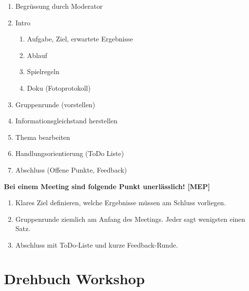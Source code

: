 \begin{enumerate}
	\item Begrüssung durch Moderator
	\item Intro
		\begin{enumerate}
			\item Aufgabe, Ziel, erwartete Ergebnisse
			\item Ablauf
			\item Spielregeln
			\item Doku (Fotoprotokoll)
		\end{enumerate}
	\item Gruppenrunde (vorstellen)
	\item Informationsgleichstand herstellen
	\item Thema bearbeiten
	\item Handlungsorientierung (ToDo Liste)
	\item Abschluss (Offene Punkte, Feedback)
\end{enumerate}

\textbf{Bei einem Meeting sind folgende Punkt unerlässlich! [MEP]}
\begin{enumerate}
	\item Klares Ziel definieren, welche Ergebnisse müssen am Schluss vorliegen.
	\item Gruppenrunde ziemlich am Anfang des Meetings. Jeder sagt wenigsten einen Satz.
	\item Abschluss mit ToDo-Liste und kurze Feedback-Runde.
\end{enumerate}

\section{Drehbuch Workshop}


